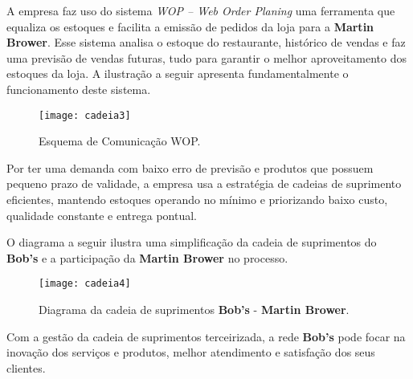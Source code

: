 		A empresa faz uso do sistema \emph{WOP – Web Order Planing} uma ferramenta que equaliza os estoques e facilita a emissão de pedidos da loja para a \textbf{Martin Brower}. Esse sistema analisa o estoque do restaurante, histórico de vendas e faz uma previsão de vendas futuras, tudo para garantir o melhor aproveitamento dos estoques da loja. A ilustração a seguir apresenta fundamentalmente o funcionamento deste sistema. 

		\begin{figure}[h]
			\centering
			\texttt{[image: cadeia3]}
			\caption[Esquema de Comunicação WOP]{Esquema de Comunicação WOP.}
			\label{fig:cadeia3}
		\end{figure}

		Por ter uma demanda com baixo erro de previsão e produtos que possuem pequeno prazo de validade, a empresa usa a estratégia de cadeias de suprimento eficientes, mantendo estoques operando no mínimo e priorizando baixo custo, qualidade constante e entrega pontual.	

		O diagrama a seguir ilustra uma simplificação da cadeia de suprimentos do \textbf{Bob’s} e a participação da \textbf{Martin Brower} no processo.

		\newpage
		\begin{figure}[h]
			\centering
			\texttt{[image: cadeia4]}
			\caption[Diagrama da cadeia de suprimentos Bob's - Martin Brower]{Diagrama da cadeia de suprimentos \textbf{Bob’s} - \textbf{Martin Brower}.}
			\label{fig:cadeia4}
		\end{figure}

		Com a gestão da cadeia de suprimentos terceirizada, a rede \textbf{Bob’s} pode focar na inovação dos serviços e produtos, melhor atendimento e satisfação dos seus clientes.
